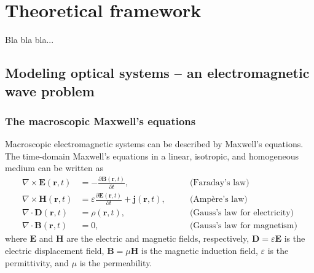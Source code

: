 \chapter{Theoretical framework}

Bla bla bla...






\section{Modeling optical systems -- an electromagnetic wave problem}

\subsection*{The macroscopic Maxwell's equations}

Macroscopic electromagnetic systems can be described by Maxwell's equations. The time-domain Maxwell's equations in a linear, isotropic, and homogeneous medium can be written as
\begin{align}
    \nabla \times \mathbf{E} (\mathbf{r},t) &= - \frac{\partial \mathbf{B}(\mathbf{r},t)}{\partial t}, \quad \quad &\text{(Faraday's law)} \label{eq:curlE_time}\\
    \nabla \times \mathbf{H} (\mathbf{r},t) &= \varepsilon \frac{\partial \mathbf{E}(\mathbf{r},t)}{\partial t} + \mathbf{j}(\mathbf{r},t), \quad \quad &\text{(Ampère's law)} \label{eq:curlH_time}\\
    \nabla \cdot \mathbf{D} (\mathbf{r},t) &= \rho(\mathbf{r},t), \quad \quad &\text{(Gauss's law for electricity)} \label{eq:divD_time}\\
    \nabla \cdot \mathbf{B} (\mathbf{r},t) &= 0, \quad \quad &\text{(Gauss's law for magnetism)} \label{eq:divB_time}
\end{align}
where $\mathbf{E}$ and $\mathbf{H}$ are the electric and magnetic fields, respectively, 
$\mathbf{D} = \varepsilon \mathbf{E}$ is the electric displacement field, 
$\mathbf{B} = \mu \mathbf{H}$ is the magnetic induction field, 
$\varepsilon$ is the permittivity, and $\mu$ is the permeability.

